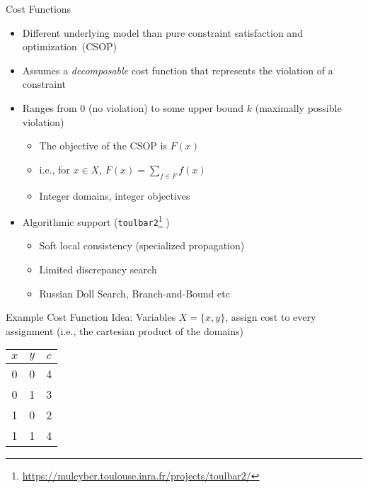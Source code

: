 \documentclass[handout,10pt,xcolor={dvipsnames},fleqn]{beamer}
\begin{document}
\begin{frame}{Cost Functions}
\begin{itemize}
\item Different underlying model than pure constraint satisfaction and optimization~(CSOP)
\item Assumes a \emph{decomposable} cost function that represents the \alert{violation} of a constraint
\item Ranges from 0 (no violation) to some upper bound $k$ (maximally possible violation) 
\begin{itemize}
\item The objective of the CSOP is $F(x)$
\item i.e., for $x \in X$, $F(x) = \sum_{f \in F} f(x)$
\item Integer domains, integer objectives 
\end{itemize}
\vspace*{2ex}
\item Algorithmic support (\texttt{toulbar2}\footnote{\url{https://mulcyber.toulouse.inra.fr/projects/toulbar2/}} \cite{allouche2010toulbar2})
\begin{itemize}
\item Soft local consistency (specialized propagation)
\item Limited discrepancy search
\item Russian Doll Search, Branch-and-Bound etc
\end{itemize}
\end{itemize}
\end{frame}

\begin{frame}[fragile]{Example Cost Function}
Idea: Variables $X = \{x, y \}$, assign cost to every assignment (i.e., the cartesian product of the domains)
\begin{center}
\begin{tabular}{cc|c}
$x$ & $y$ & $c$ \\ 
\hline 
0 & 0 & 4 \\ 
0 & 1 & 3 \\ 
1 & 0 & 2 \\ 
1 & 1 & 4 \\ 
\end{tabular} 
\end{center}
\end{frame}
\end{document}
